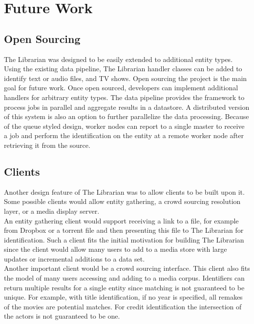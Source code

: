 \documentclass[paper=a4, fontsize=11pt]{scrartcl} %
\numberwithin{equation}{section} %
\numberwithin{figure}{section} %
\numberwithin{table}{section} %
\begin{document}

\section{Future Work}
\label{sec:future-work}

\subsection{Open Sourcing}
\label{sec:open-sourcing}
The Librarian was designed to be easily extended to additional entity types. Using the existing data pipeline, The Librarian handler classes can be added to identify text or audio files, and TV shows. Open sourcing the project is the main goal for future work. Once open sourced, developers can implement additional handlers for arbitrary entity types. The data pipeline provides the framework to process jobs in parallel and aggregate results in a datastore. A distributed version of this system is also an option to further parallelize the data processing. Because of the queue styled design, worker nodes can report to a single master to receive a job and perform the identification on the entity at a remote worker node after retrieving it from the source. \\

\subsection{Clients}
\label{sec:clients}
Another design feature of The Librarian was to allow clients to be built upon it. Some possible clients would allow entity gathering, a crowd sourcing resolution layer, or a media display server. \\

An entity gathering client would support receiving a link to a file, for example from Dropbox or a torrent file and then presenting this file to The Librarian for identification. Such a client fits the initial motivation for building The Librarian since the client would allow many users to add to a media store with large updates or incremental additions to a data set. \\

Another important client would be a crowd sourcing interface. This client also fits the model of many users accessing and adding to a media corpus. Identifiers can return multiple results for a single entity since matching is not guaranteed to be unique. For example, with title identification, if no year is specified, all remakes of the movies are potential matches. For credit identification the intersection of the actors is not guaranteed to be one. \\
\end{document}
